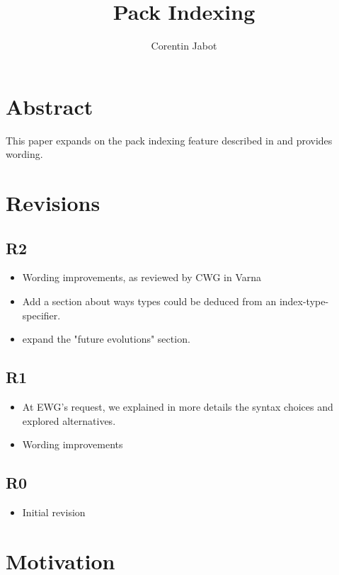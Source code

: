 \documentclass{wg21}
\title{Pack Indexing}
\author{Corentin Jabot}{corentin.jabot@gmail.com}
\begin{document}
\maketitle

\section{Abstract}

This paper expands on the pack indexing feature described in  and provides wording.

\section{Revisions}

\subsection{R2}

\begin{itemize}
\item Wording improvements, as reviewed by CWG in Varna
\item Add a section about ways types could be deduced from an index-type-specifier.
\item expand the "future evolutions" section.
\end{itemize}

\subsection{R1}

\begin{itemize}
\item At EWG's request, we explained in more details the syntax choices and explored alternatives.
\item Wording improvements
\end{itemize}

\subsection{R0}

\begin{itemize}
\item{Initial revision}
\end{itemize}

\section{Motivation}
\end{document}
